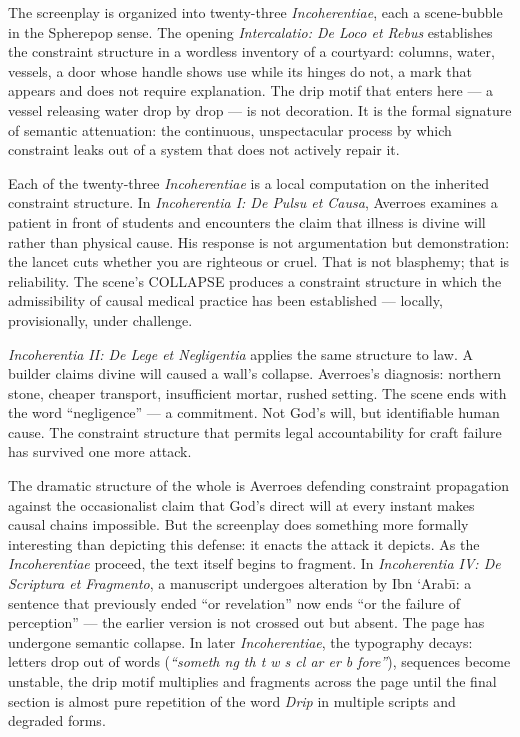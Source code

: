 \documentclass[11pt, a4paper]{article}
\theoremstyle{definition}
\theoremstyle{remark}
\begin{document}
The screenplay is organized into twenty-three \textit{Incoherentiae}, each
a scene-bubble in the Spherepop sense. The opening \textit{Intercalatio: De
Loco et Rebus} establishes the constraint structure in a wordless inventory
of a courtyard: columns, water, vessels, a door whose handle shows use
while its hinges do not, a mark that appears and does not require explanation.
The drip motif that enters here --- a vessel releasing water drop by drop ---
is not decoration. It is the formal signature of semantic attenuation: the
continuous, unspectacular process by which constraint leaks out of a system
that does not actively repair it.

Each of the twenty-three \textit{Incoherentiae} is a local computation on the
inherited constraint structure. In \textit{Incoherentia I: De Pulsu et Causa},
Averroes examines a patient in front of students and encounters the claim that
illness is divine will rather than physical cause. His response is not
argumentation but demonstration: the lancet cuts whether you are righteous or
cruel. That is not blasphemy; that is reliability. The scene's COLLAPSE
produces a constraint structure in which the admissibility of causal medical
practice has been established --- locally, provisionally, under challenge.

\textit{Incoherentia II: De Lege et Negligentia} applies the same structure
to law. A builder claims divine will caused a wall's collapse. Averroes's
diagnosis: northern stone, cheaper transport, insufficient mortar, rushed
setting. The scene ends with the word ``negligence'' --- a commitment. Not
God's will, but identifiable human cause. The constraint structure that permits
legal accountability for craft failure has survived one more attack.

The dramatic structure of the whole is Averroes defending constraint
propagation against the occasionalist claim that God's direct will at every
instant makes causal chains impossible. But the screenplay does something
more formally interesting than depicting this defense: it enacts the attack
it depicts. As the \textit{Incoherentiae} proceed, the text itself begins to
fragment. In \textit{Incoherentia IV: De Scriptura et Fragmento}, a manuscript
undergoes alteration by Ibn `Arab\=\i: a sentence that previously ended
``or revelation'' now ends ``or the failure of perception'' --- the earlier
version is not crossed out but absent. The page has undergone semantic
collapse. In later \textit{Incoherentiae}, the typography decays: letters
drop out of words (\textit{``someth ng th t w s cl ar er b fore''}), sequences
become unstable, the drip motif multiplies and fragments across the page until
the final section is almost pure repetition of the word \textit{Drip} in
multiple scripts and degraded forms.
\end{document}
